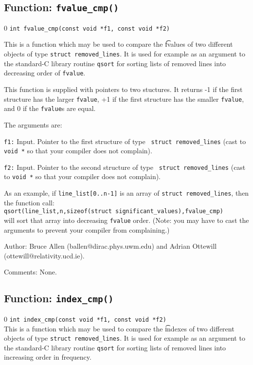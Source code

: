 \subsection{Function: {\tt fvalue\_cmp()} }
\setcounter{equation}0
{\tt int fvalue\_cmp(const void *f1, const void *f2)}

This is a function which may be used to compare the {\t fvalue}s of two
different objects of type {\tt struct removed\_lines}.  It is used for
example as an argument to the standard-C library routine {\tt qsort}
for sorting lists of removed lines into decreasing order of {\tt fvalue}.

This function is supplied with pointers to two stuctures.  It returns
-1 if the first structure has the larger {\tt fvalue},
+1 if the first structure has the smaller {\tt fvalue}, and 0 if the
{\tt fvalue}s are equal.

The arguments are:
\begin{description}
\item{\tt f1:} Input.  Pointer to the first structure of type {\tt
struct removed\_lines} (cast to {\tt void *} so that your compiler does not complain).
\item{\tt f2:} Input.  Pointer to the second structure of type {\tt
struct removed\_lines} (cast to {\tt void *} so that your compiler does not complain).
\end{description}

As an example, if {\tt line\_list[0..n-1]} is an array of  {\tt struct removed\_lines}, then
the function call:\\
{\tt qsort(line\_list,n,sizeof(struct significant\_values),fvalue\_cmp) }\\
will sort that array into decreasing {\tt fvalue} order.  (Note: you may
have to cast the arguments to prevent your compiler from complaining.)
\begin{description}
\item{Author:}
Bruce Allen (ballen@dirac.phys.uwm.edu) and Adrian Ottewill
(ottewill@relativity.ucd.ie).
\item{Comments:}
None.
\end{description}
\clearpage


\subsection{Function: {\tt index\_cmp()} }
\setcounter{equation}0
{\tt int index\_cmp(const void *f1, const void *f2)}\\
This is a function which may be used to compare the {\t index}es of two
different objects of type {\tt struct removed\_lines}.  It is used for
example as an argument to the standard-C library routine {\tt qsort}
for sorting lists of removed lines into increasing order in frequency.


